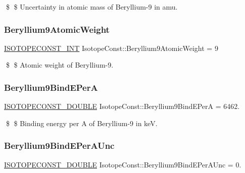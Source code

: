 \$ \$ Uncertainty in atomic mass of Beryllium-\/9 in amu. \mbox{\label{group___isotope_const-_beryllium-_be9_ga14128c7a98f1919b2d3f6c7aa07b8061}} 
\subsubsection{\texorpdfstring{Beryllium9\+Atomic\+Weight}{Beryllium9AtomicWeight}}
{\footnotesize\ttfamily \mbox{\hyperlink{group___isotope_const-_macros_ga5f18360b3e99483a35c32d789e62621c}{I\+S\+O\+T\+O\+P\+E\+C\+O\+N\+S\+T\+\_\+\+I\+NT}} Isotope\+Const\+::\+Beryllium9\+Atomic\+Weight = 9}

\$ \$ Atomic weight of Beryllium-\/9. \mbox{\label{group___isotope_const-_beryllium-_be9_ga55d48f827a7fc2dd26a8ef0d11f4fc16}} 
\subsubsection{\texorpdfstring{Beryllium9\+Bind\+E\+PerA}{Beryllium9BindEPerA}}
{\footnotesize\ttfamily \mbox{\hyperlink{group___isotope_const-_macros_ga8f45a7272ce02c0b4c65c44636ed719a}{I\+S\+O\+T\+O\+P\+E\+C\+O\+N\+S\+T\+\_\+\+D\+O\+U\+B\+LE}} Isotope\+Const\+::\+Beryllium9\+Bind\+E\+PerA = 6462.}

\$ \$ Binding energy per A of Beryllium-\/9 in keV. \mbox{\label{group___isotope_const-_beryllium-_be9_ga2c20c10bc6993d97b271501d73731afb}} 
\subsubsection{\texorpdfstring{Beryllium9\+Bind\+E\+Per\+A\+Unc}{Beryllium9BindEPerAUnc}}
{\footnotesize\ttfamily \mbox{\hyperlink{group___isotope_const-_macros_ga8f45a7272ce02c0b4c65c44636ed719a}{I\+S\+O\+T\+O\+P\+E\+C\+O\+N\+S\+T\+\_\+\+D\+O\+U\+B\+LE}} Isotope\+Const\+::\+Beryllium9\+Bind\+E\+Per\+A\+Unc = 0.}


